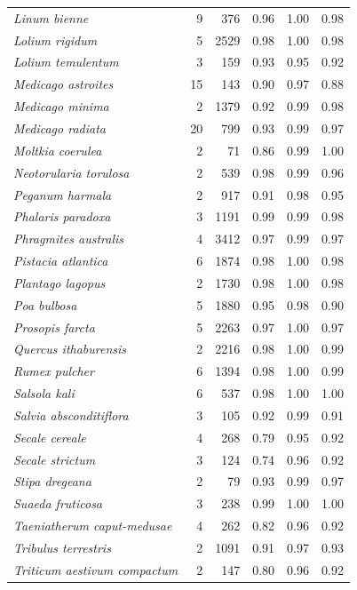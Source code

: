 \documentclass[
  authoryear,
  preprint]{elsarticle}
\begin{document}
\begin{longtable}{@{\extracolsep{\fill}}lrrrrr}
{\itshape Linum bienne} & 9 & 376 & 0.96 & 1.00 & 0.98 \\ 
{\itshape Lolium rigidum} & 5 & 2529 & 0.98 & 1.00 & 0.98 \\ 
{\itshape Lolium temulentum} & 3 & 159 & 0.93 & 0.95 & 0.92 \\ 
{\itshape Medicago astroites} & 15 & 143 & 0.90 & 0.97 & 0.88 \\ 
{\itshape Medicago minima} & 2 & 1379 & 0.92 & 0.99 & 0.98 \\ 
{\itshape Medicago radiata} & 20 & 799 & 0.93 & 0.99 & 0.97 \\ 
{\itshape Moltkia coerulea} & 2 & 71 & 0.86 & 0.99 & 1.00 \\ 
{\itshape Neotorularia torulosa} & 2 & 539 & 0.98 & 0.99 & 0.96 \\ 
{\itshape Peganum harmala} & 2 & 917 & 0.91 & 0.98 & 0.95 \\ 
{\itshape Phalaris paradoxa} & 3 & 1191 & 0.99 & 0.99 & 0.98 \\ 
{\itshape Phragmites australis} & 4 & 3412 & 0.97 & 0.99 & 0.97 \\ 
{\itshape Pistacia atlantica} & 6 & 1874 & 0.98 & 1.00 & 0.98 \\ 
{\itshape Plantago lagopus} & 2 & 1730 & 0.98 & 1.00 & 0.98 \\ 
{\itshape Poa bulbosa} & 5 & 1880 & 0.95 & 0.98 & 0.90 \\ 
{\itshape Prosopis farcta} & 5 & 2263 & 0.97 & 1.00 & 0.97 \\ 
{\itshape Quercus ithaburensis} & 2 & 2216 & 0.98 & 1.00 & 0.99 \\ 
{\itshape Rumex pulcher} & 6 & 1394 & 0.98 & 1.00 & 0.99 \\ 
{\itshape Salsola kali} & 6 & 537 & 0.98 & 1.00 & 1.00 \\ 
{\itshape Salvia absconditiflora} & 3 & 105 & 0.92 & 0.99 & 0.91 \\ 
{\itshape Secale cereale} & 4 & 268 & 0.79 & 0.95 & 0.92 \\ 
{\itshape Secale strictum} & 3 & 124 & 0.74 & 0.96 & 0.92 \\ 
{\itshape Stipa dregeana} & 2 & 79 & 0.93 & 0.99 & 0.97 \\ 
{\itshape Suaeda fruticosa} & 3 & 238 & 0.99 & 1.00 & 1.00 \\ 
{\itshape Taeniatherum caput-medusae} & 4 & 262 & 0.82 & 0.96 & 0.92 \\ 
{\itshape Tribulus terrestris} & 2 & 1091 & 0.91 & 0.97 & 0.93 \\ 
{\itshape Triticum aestivum compactum} & 2 & 147 & 0.80 & 0.96 & 0.92 \\ 

\end{longtable}
\end{document}
